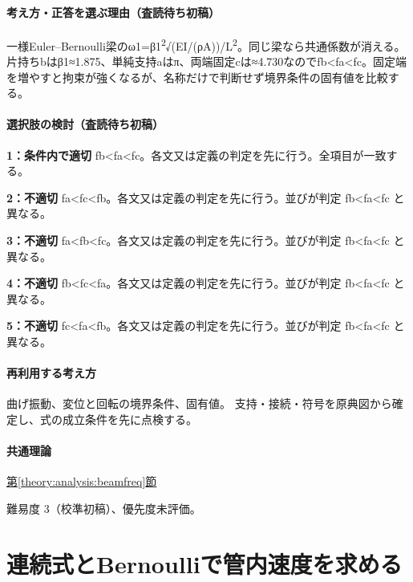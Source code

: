 \paragraph{考え方・正答を選ぶ理由（査読待ち初稿）} 一様Euler–Bernoulli梁のω1=β1\textsuperscript{2}√(EI/(ρA))/L\textsuperscript{2}。同じ梁なら共通係数が消える。片持ちbはβ1≈1.875、単純支持aはπ、両端固定cは≈4.730なのでfb<fa<fc。固定端を増やすと拘束が強くなるが、名称だけで判断せず境界条件の固有値を比較する。

\paragraph{選択肢の検討（査読待ち初稿）}\mbox{}\par

\noindent\textbf{1：条件内で適切} fb<fa<fc。各文又は定義の判定を先に行う。全項目が一致する。\par

\noindent\textbf{2：不適切} fa<fc<fb。各文又は定義の判定を先に行う。並びが判定 fb<fa<fc と異なる。\par

\noindent\textbf{3：不適切} fa<fb<fc。各文又は定義の判定を先に行う。並びが判定 fb<fa<fc と異なる。\par

\noindent\textbf{4：不適切} fb<fc<fa。各文又は定義の判定を先に行う。並びが判定 fb<fa<fc と異なる。\par

\noindent\textbf{5：不適切} fc<fa<fb。各文又は定義の判定を先に行う。並びが判定 fb<fa<fc と異なる。\par

\paragraph{再利用する考え方} 曲げ振動、変位と回転の境界条件、固有値。 支持・接続・符号を原典図から確定し、式の成立条件を先に点検する。

\paragraph{共通理論} \hyperref[theory:analysis:beamfreq]{第\ref*{theory:analysis:beamfreq}節}

\par 難易度 3（校準初稿）、優先度未評価。

\section{連続式とBernoulliで管内速度を求める}


